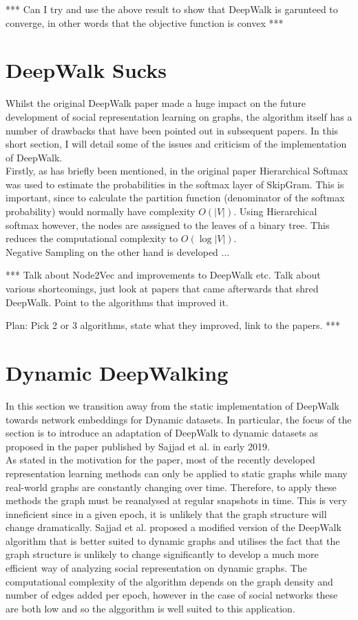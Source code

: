\documentclass[a4paper]{article}
\begin{document}
*** Can I try and use the above result to show that DeepWalk is garunteed to
converge, in other words that the objective function is convex ***

\section{DeepWalk Sucks}
Whilst the original DeepWalk paper made a huge impact on the future development
of social representation learning on graphs, the algorithm itself has a number
of drawbacks that have been pointed out in subsequent papers. In this short
section, I will detail some of the issues and criticism of the implementation of DeepWalk.\\

Firstly, as has briefly been mentioned, in the original paper Hierarchical
Softmax was used to estimate the probabilities in the softmax layer of SkipGram.
This is important, since to calculate the partition function (denominator of the
softmax probability) would normally have complexity $O(|V|)$. Using Hierarchical
softmax however, the nodes are asssigned to the leaves of a binary tree. This
reduces the computational complexity to $O(\log{|V|})$.\\

Negative Sampling on the other hand is developed ...

*** Talk about Node2Vec and improvements to DeepWalk etc. Talk about various
shortcomings, just look at papers that came afterwards that shred DeepWalk.
Point to the algorithms that improved it.

Plan: Pick 2 or 3 algorithms, state what they improved, link to the papers.
***
\section{Dynamic DeepWalking}
In this section we transition away from the static implementation of DeepWalk
towards network embeddings for Dynamic datasets. In particular, the focus of the
section is to introduce an adaptation of DeepWalk to dynamic datasets as
proposed in the paper published by Sajjad et al.\cite{sajjad2019} in early
2019.\\

As stated in the motivation for the paper, most of the recently developed
representation learning methods can only be applied to static graphs while many
real-world graphs are constantly changing over time. Therefore, to apply these
methods the graph must be reanalysed at regular snapshots in time. This is very
inneficient since in a given epoch, it is unlikely that the graph structure will
change dramatically. Sajjad et al. proposed a modified version of the DeepWalk
algorithm that is better suited to dynamic graphs and utilises the fact that the
graph structure is unlikely to change significantly to develop a much more
efficient way of analyzing social representation on dynamic graphs.
The computational complexity of the algorithm depends on the graph density and
number of edges added per epoch, however in the case of social networks these
are both low and so the alggorithm is well suited to this application.\\
\end{document}
